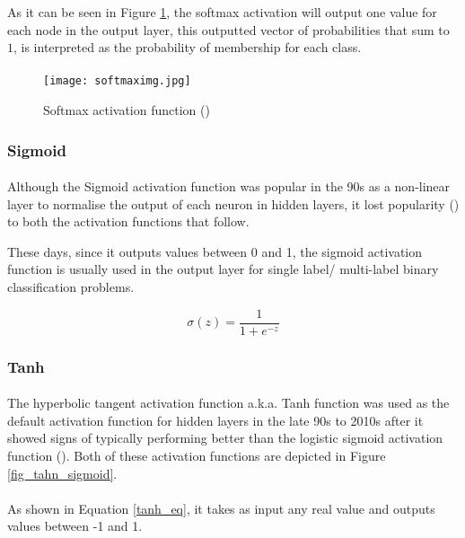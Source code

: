 As it can be seen in Figure \ref{fig_softmax}, the softmax activation will output one value for each node in the output layer, this outputted vector of probabilities that sum to $1$, is interpreted as the probability of membership for each class.
\paragraph{}
\begin{figure}[hbt!]
    \centering
    \texttt{[image: softmaximg.jpg]}
    \caption{Softmax activation function (\cite{softmaxpic})}
    \label{fig_softmax}
\end{figure}

\subsubsection{Sigmoid}
\paragraph{}
Although the Sigmoid activation function was popular in the 90s as a non-linear layer to normalise the output of each neuron in hidden layers, it lost popularity (\cite{GoodBengCour16}) to both the activation functions that follow.

These days, since it outputs values between 0 and 1, the sigmoid activation function is usually used in the output layer for single label/ multi-label binary classification problems. 

\begin{equation}
    \label{sigmoid_eq}
    \sigma(z) = \frac{1} {1 + e^{-z}}
\end{equation}


\subsubsection{Tanh}
\paragraph{}
The hyperbolic tangent activation function \gls{a.k.a.} Tanh function was used as the default activation function for hidden layers in the late 90s to 2010s after it showed signs of typically performing better than the logistic sigmoid activation function (\cite{GoodBengCour16}).
Both of these activation functions are depicted in Figure \ref{fig_tahn_sigmoid}.
\paragraph{}
As shown in Equation \ref{tanh_eq}, it takes as input any real value and outputs values between -1 and 1.

